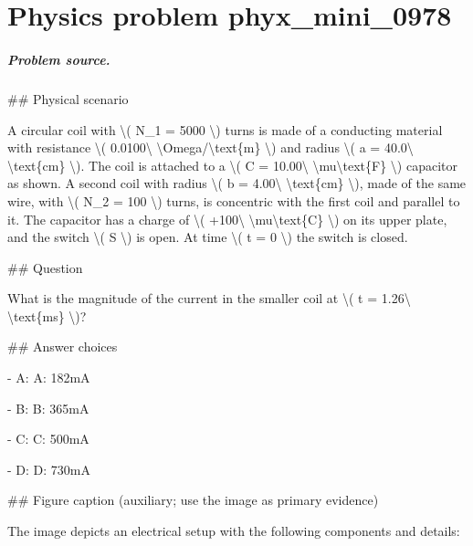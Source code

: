 
\chapter{Physics problem phyx\_mini\_0978}
\label{ch:PhyXMiniProblems_problem_phyx_mini_0978}

\paragraph{Problem source.}
\#\# Physical scenario

A circular coil with \textbackslash{}( N\_1 = 5000 \textbackslash{}) turns is made of a conducting material with resistance \textbackslash{}( 0.0100\textbackslash{} \textbackslash{}Omega/\textbackslash{}text\{m\} \textbackslash{}) and radius \textbackslash{}( a = 40.0\textbackslash{} \textbackslash{}text\{cm\} \textbackslash{}). The coil is attached to a \textbackslash{}( C = 10.00\textbackslash{} \textbackslash{}mu\textbackslash{}text\{F\} \textbackslash{}) capacitor as shown. A second coil with radius \textbackslash{}( b = 4.00\textbackslash{} \textbackslash{}text\{cm\} \textbackslash{}), made of the same wire, with \textbackslash{}( N\_2 = 100 \textbackslash{}) turns, is concentric with the first coil and parallel to it. The capacitor has a charge of \textbackslash{}( +100\textbackslash{} \textbackslash{}mu\textbackslash{}text\{C\} \textbackslash{}) on its upper plate, and the switch \textbackslash{}( S \textbackslash{}) is open. At time \textbackslash{}( t = 0 \textbackslash{}) the switch is closed.

\#\# Question

What is the magnitude of the current in the smaller coil at \textbackslash{}( t = 1.26\textbackslash{} \textbackslash{}text\{ms\} \textbackslash{})?

\#\# Answer choices

- A: A: 182mA

- B: B: 365mA

- C: C: 500mA

- D: D: 730mA

\#\# Figure caption (auxiliary; use the image as primary evidence)

The image depicts an electrical setup with the following components and details:

